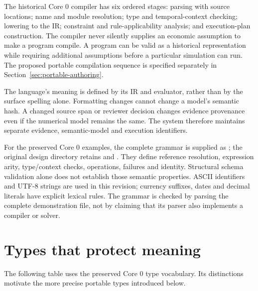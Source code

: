 The historical Core 0 compiler has six ordered stages: parsing with source locations; name and
module resolution; type and temporal-context checking; lowering to the IR;
constraint and rule-applicability analysis; and execution-plan construction.
The compiler never silently supplies an economic assumption to make a program
compile. A program can be valid as a historical representation while requiring
additional assumptions before a particular simulation can run.
The proposed portable compilation sequence is specified separately in
Section~\ref{sec:portable-authoring}.

The language's meaning is defined by its IR and evaluator, rather than by the
surface spelling alone. Formatting changes cannot change a model's semantic
hash. A changed source span or reviewer decision changes evidence provenance
even if the numerical model remains the same. The system therefore maintains
separate evidence, semantic-model and execution identifiers.

For the preserved Core 0 examples, the complete grammar is supplied as
; the original design directory retains
 and . They define reference resolution, expression arity,
type/context checks, operations, failures and identity. Structural schema
validation alone does not establish those semantic properties. ASCII
identifiers and UTF-8 strings are used in this revision; currency suffixes,
dates and decimal literals have explicit lexical rules. The grammar is checked
by parsing the complete demonstration file, not by claiming that its parser
also implements a compiler or solver.

\section{Types that protect meaning}

The following table uses the preserved Core 0 type vocabulary. Its distinctions
motivate the more precise portable types introduced below.

